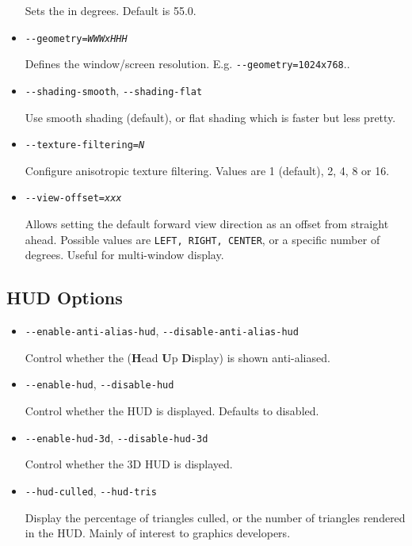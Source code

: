 \begin{itemize}
Sets the  in degrees. Default is 55.0.

\item{\texttt{-$ $-geometry={\it WWWxHHH}}}

Defines the window/screen resolution. E.g. \texttt{-$ $-geometry=1024x768}..

\item{\texttt{-$ $-shading-smooth}, \texttt{-$ $-shading-flat}}

Use smooth shading (default), or flat shading which is faster but less pretty.

\item{\texttt{-$ $-texture-filtering={\it N}}}

Configure anisotropic texture filtering. Values are 1 (default), 2, 4, 8 or 16.

\item{\texttt{-$ $-view-offset={\it xxx}}}

Allows setting the default forward view direction as an offset from straight ahead.
Possible values are \texttt{LEFT, RIGHT, CENTER}, or a specific number of degrees.
Useful for multi-window display.
\end{itemize}

\subsection{HUD Options}
\begin{itemize}
\item{\texttt{-$ $-enable-anti-alias-hud}, \texttt{-$ $-disable-anti-alias-hud}}

Control whether the  (\textbf{H}ead \textbf{U}p  \textbf{D}isplay) is shown anti-aliased.

\item{\texttt{-$ $-enable-hud}, \texttt{-$ $-disable-hud}}

Control whether the HUD is displayed. Defaults to disabled.

\item{\texttt{-$ $-enable-hud-3d}, \texttt{-$ $-disable-hud-3d}}

Control whether the 3D HUD is displayed.

\item{\texttt{-$ $-hud-culled}, \texttt{-$ $-hud-tris}}

Display the percentage of triangles culled, or the number of triangles rendered in the HUD. Mainly
of interest to graphics developers.

\end{itemize}

